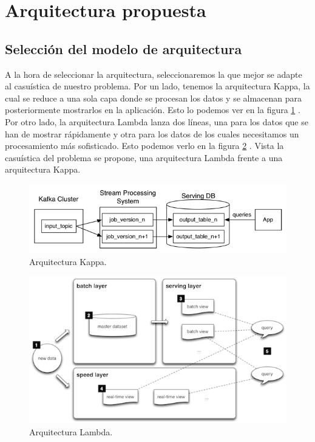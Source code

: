 \section{Arquitectura propuesta \label{propuesta}}
\subsection{Selección del modelo de arquitectura\label{arqSelect}}
A la hora de seleccionar la arquitectura, seleccionaremos la que mejor se adapte al casuística de nuestro problema. Por un lado, tenemos la arquitectura Kappa, la cual se reduce a una sola capa donde se procesan los datos y se almacenan para posteriormente mostrarlos en la aplicación. Esto lo podemos ver en la figura \ref{arqKappa} \cite{LambdaKappa2}. Por otro lado, la arquitectura Lambda lanza dos líneas, una para los datos que se han de mostrar rápidamente y otra para los datos de los cuales necesitamos un procesamiento más sofisticado. Esto podemos verlo en la figura \ref{arqLambda} \cite{LambdaKappa}. Vista la casuística del problema se propone, una arquitectura Lambda frente a una arquitectura Kappa.\par

\begin{figure}[htp]
\centering
\includegraphics[scale=0.70]{Imagenes/arq1.png}
\caption{Arquitectura Kappa.}
\label{arqKappa}
\end{figure}

\begin{figure}[htp]
\centering
\includegraphics[scale=0.70]{Imagenes/arq2.png}
\caption{Arquitectura Lambda.}
\label{arqLambda}
\end{figure}

